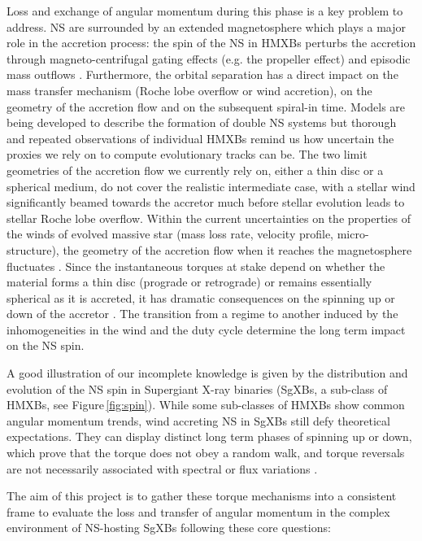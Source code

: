 \documentclass[12pt,onecolumn]{article}
\makeatletter
\newcommand{\sgxs}{SgXBs\xspace}
\newcommand*{\hmxbs}{HMXBs\@\xspace}
\newcommand*{\ns}{NS\@\xspace}
\newcommand*{\eg}{e.g.\@\xspace}
\makeatother
\begin{document}
Loss and exchange of angular momentum during this phase is a key problem to address. \ns are surrounded by an extended magnetosphere which plays a major role in the accretion process: the spin of the \ns in \hmxbs perturbs the accretion through magneto-centrifugal gating effects (\eg the propeller effect) and episodic mass outflows \cite{Bozzo2008}. Furthermore, the orbital separation has a direct impact on the mass transfer mechanism (Roche lobe overflow or wind accretion), on the geometry of the accretion flow and on the subsequent spiral-in time. Models are being developed to describe the formation of double \ns systems \cite{Tauris2017} but thorough and repeated observations of individual \hmxbs remind us how uncertain the proxies we rely on to compute evolutionary tracks can be. The two limit geometries of the accretion flow we currently rely on, either a thin disc or a spherical medium, do not cover the realistic intermediate case, with a stellar wind significantly beamed towards the accretor much before stellar evolution leads to stellar Roche lobe overflow. Within the current uncertainties on the properties of the winds of evolved massive star (mass loss rate, velocity profile, micro-structure), the geometry of the accretion flow when it reaches the magnetosphere fluctuates \cite{ElMellah2018}. Since the instantaneous torques at stake depend on whether the material forms a thin disc (prograde or retrograde) or remains essentially spherical as it is accreted, it has dramatic consequences on the spinning up or down of the accretor \cite{Ghosh1978,Shakura2012}. The transition from a regime to another induced by the inhomogeneities in the wind and the duty cycle determine the long term impact on the \ns spin.

A good illustration of our incomplete knowledge is given by the distribution and evolution of the \ns spin in Supergiant X-ray binaries (\sgxs, a sub-class of \hmxbs, see Figure\,\ref{fig:spin}). While some sub-classes of \hmxbs show common angular momentum trends, wind accreting \ns in \sgxs still defy theoretical expectations. They can display distinct long term phases of spinning up or down, which prove that the torque does not obey a random walk, and torque reversals are not necessarily associated with spectral or flux variations \cite{Hemphill2013}. 

The aim of this project is to gather these torque mechanisms into a consistent frame to evaluate the loss and transfer of angular momentum in the complex environment of \ns-hosting \sgxs following these core questions:
\end{document}
